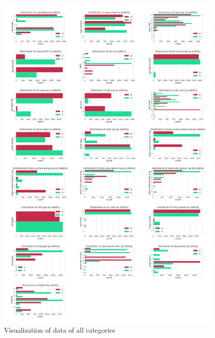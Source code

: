 \documentclass[]{article}
\begin{document}
\begin{figure}[!htb]
	\centering
	\includegraphics[scale=0.116]{visualize.jpeg}
	\caption{Visualization of data of all categories}
	\label{fig}
\end{figure}
\end{document}

